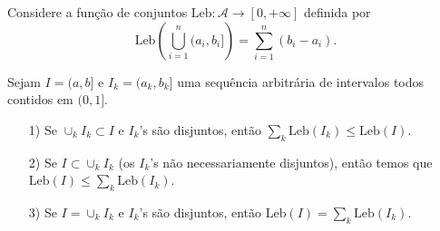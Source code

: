 Considere a função de conjuntos 
$\mathrm{Leb}:\mathcal{A}\to [0,+\infty]$ definida por 
\[
\mathrm{Leb}
\left(
	\bigcup_{i=1}^n (a_i,b_i]
\right) 
= 
\sum_{i=1}^{n} (b_i-a_i).
\]


\begin{teorema}\label{teo-leb-sigma-aditiva-algebra}
Sejam $I=(a,b]$ e $I_k=(a_k,b_k]$ 
uma sequência arbitrária de intervalos 
todos contidos em $(0,1]$.
\begin{itemize}
	\item[1)] 
	Se $\cup_{k}I_k\subset I$ e 
	$I_k$'s são disjuntos, 
	então $\sum_{k}\mathrm{Leb}(I_k)\leq \mathrm{Leb}(I)$.
	
	\item[2)]
	Se $I\subset \cup_k I_k$ (os $I_k$'s não necessariamente disjuntos),
	então temos que $\mathrm{Leb}(I)\leq \sum_{k}\mathrm{Leb}(I_k)$.
	
	\item[3)]
	Se $I=\cup_k I_k$ e $I_k$'s são disjuntos, então 
	$\mathrm{Leb}(I)= \sum_{k}\mathrm{Leb}(I_k)$.
\end{itemize}
\end{teorema}



